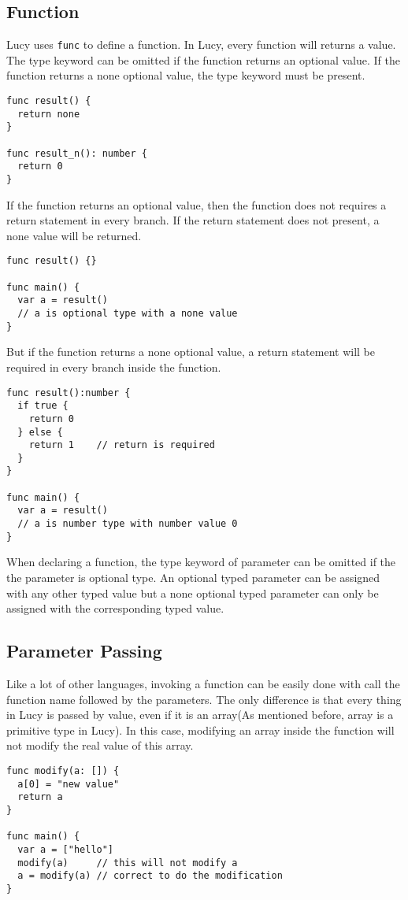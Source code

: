 \subsection{Function}
Lucy uses \texttt{func} to define a function. In Lucy, every function will returns a value. The type keyword can be omitted if the function returns an optional value. If the function returns a none optional value, the type keyword must be present.
\begin{lstlisting}
func result() {
  return none
}

func result_n(): number {
  return 0
}
\end{lstlisting}
If the function returns an optional value, then the function does not requires a return statement in every branch. If the return statement does not present, a none value will be returned.
\begin{lstlisting}
func result() {}

func main() {
  var a = result()
  // a is optional type with a none value
}
\end{lstlisting}
But if the function returns a none optional value, a return statement will be required in every branch inside the function.
\begin{lstlisting}
func result():number {
  if true {
    return 0
  } else {
    return 1    // return is required
  }
}

func main() {
  var a = result()
  // a is number type with number value 0
}
\end{lstlisting}
When declaring a function, the type keyword of parameter can be omitted if the the parameter is optional type. An optional typed parameter can be assigned with any other typed value but a none optional typed parameter can only be assigned with the corresponding typed value.

\subsection{Parameter Passing}
Like a lot of other languages, invoking a function can be easily done with call the function name followed by the parameters. The only difference is that every thing in Lucy is passed by value, even if it is an array(As mentioned before, array is a primitive type in Lucy). In this case, modifying an array inside the function will not modify the real value of this array.
\begin{lstlisting}
func modify(a: []) {
  a[0] = "new value"
  return a
}

func main() {
  var a = ["hello"]
  modify(a)     // this will not modify a
  a = modify(a) // correct to do the modification
}
\end{lstlisting}


